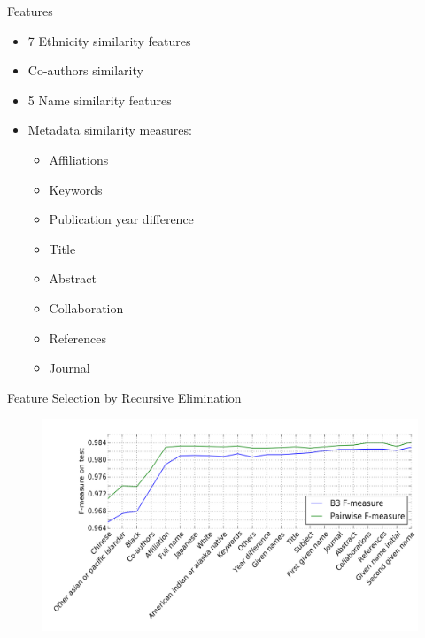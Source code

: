 \documentclass{beamer}
\begin{document}
\begin{frame} {Features}

\begin{itemize}
    \item {7 Ethnicity similarity features}
    \item {Co-authors similarity}
    \item {5 Name similarity features}
    \item {Metadata similarity measures:}
    \begin{itemize}
        \item {Affiliations}
        \item {Keywords}
        \item {Publication year difference}
        \item {Title}
        \item {Abstract}
        \item {Collaboration}
        \item {References}
        \item {Journal}
    \end{itemize}
\end{itemize}

\end{frame}


\begin{frame}{Feature Selection by Recursive Elimination}

\begin{figure}
   \centering
   \includegraphics[width=\textwidth]{./figures/fig-rfe.png}
\end{figure}

\end{frame}
\end{document}
